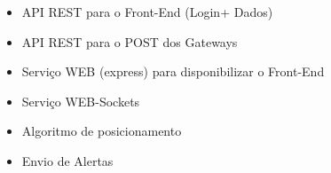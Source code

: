 \par
\begin{itemize}
\item API REST para o Front-End (Login+ Dados)
\item API REST para o POST dos Gateways
\item Serviço WEB (express) para disponibilizar o Front-End 
\item Serviço WEB-Sockets 
\item Algoritmo de posicionamento
\item Envio de Alertas
\end{itemize}
\par



\par
